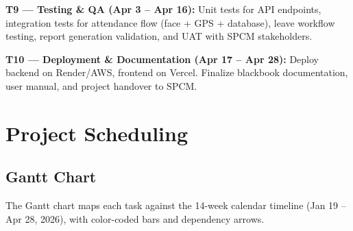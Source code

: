 \documentclass[12pt,a4paper]{article}
\begin{document}
\textbf{T9 --- Testing \& QA (Apr 3 -- Apr 16):}
Unit tests for API endpoints, integration tests for attendance flow (face + GPS + database), leave workflow testing, report generation validation, and UAT with SPCM stakeholders.

\textbf{T10 --- Deployment \& Documentation (Apr 17 -- Apr 28):}
Deploy backend on Render/AWS, frontend on Vercel. Finalize blackbook documentation, user manual, and project handover to SPCM.

\section{Project Scheduling}

\subsection{Gantt Chart}
The Gantt chart maps each task against the 14-week calendar timeline (Jan 19 -- Apr 28, 2026), with color-coded bars and dependency arrows.
\end{document}
